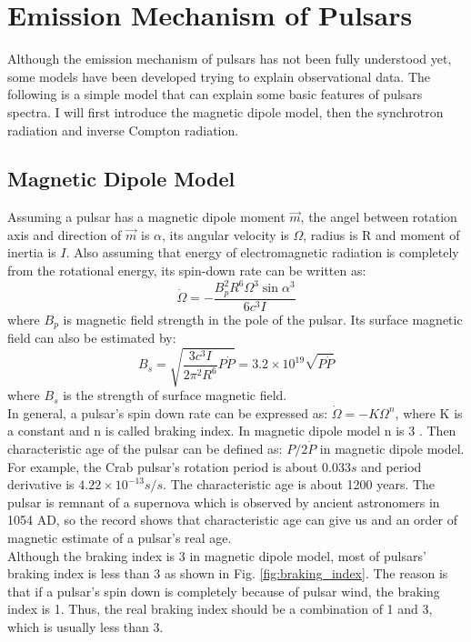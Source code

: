\documentclass[12pt]{report}
\begin{document}
     \section{Emission Mechanism of Pulsars}
            Although the emission mechanism of pulsars has not been fully understood yet, some models 
            have been developed 
            trying to explain observational data. The following is a simple model that can explain some basic 
            features of pulsars spectra. I will first introduce the magnetic dipole model, then the
            synchrotron radiation and inverse Compton radiation. 
       
        \subsection{Magnetic Dipole Model}
            Assuming a pulsar has a magnetic dipole moment $\vec{m}$, the angel between rotation axis and 
            direction of 
            $\vec{m}$ is $\alpha$, its angular velocity is $\Omega$, radius is R and moment of inertia is $I$. 
            Also assuming that energy of electromagnetic radiation is completely from the rotational energy, 
            its spin-down rate can be written as: 
            $$
                \dot{\Omega}=-\frac{B_p^2 R^6 \Omega^3 \sin{\alpha}^3}{6c^3I}
            $$
            where $B_p$ is magnetic field strength in the pole of the pulsar. Its surface magnetic field can 
            also be estimated
            by:
            $$
                B_s=\sqrt{\frac{3c^3I}{2\pi^2R^6}P\dot{P}}=3.2\times 10^{19}\sqrt{P\dot{P}}
            $$
            where $B_s$ is the strength of surface magnetic field. \\
            \indent In general, a pulsar's spin down rate can be expressed as: $\dot{\Omega}=-K\Omega^{n}$, 
            where K is a 
            constant and n is called braking index. In magnetic dipole model n is 3 \cite{Tong2015}. Then 
            characteristic age of the pulsar can be defined as: $P/2\dot{P}$ in magnetic dipole model. 
            For example, the Crab 
            pulsar's rotation period is about $0.033s$ and period derivative is $4.22\times 10^{-13}s/s$. 
            The characteristic 
            age is about 1200 years. The pulsar is remnant of a supernova which is observed by ancient 
            astronomers in 1054 
            AD, so the record shows that characteristic age can give us and an order of magnetic estimate of a 
            pulsar's real age. \\
            \indent 
            Although the braking index is 3 in magnetic dipole model, most of pulsars' braking index is less than 3 as 
            shown in Fig. \ref{fig:braking_index}. The reason is that if a pulsar's spin down is completely because
            of pulsar wind, the braking index is 1. Thus, the real braking index should be a combination of 1 and 3,
            which is usually less than 3. \cite{PhysRevD.91.063007}
\end{document}
